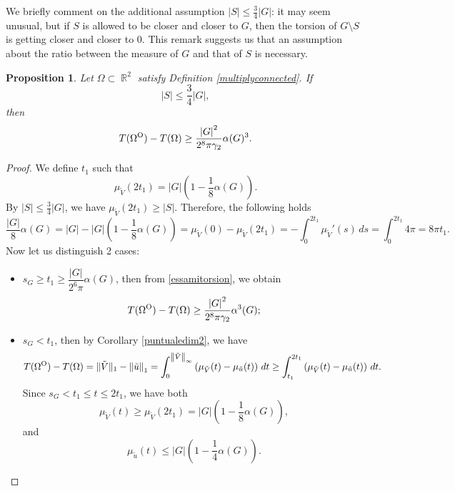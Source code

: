 \documentclass[oneside,a4paper,11pt,notitlepage]{article}
\newcommand{\abs}[1]{{\left|#1\right|}}
\newcommand{\norma}[1]{{\left\Vert#1\right\Vert}}
\theoremstyle{definition}
\theoremstyle{plain}
\newtheorem{prop}[theorem]{Proposition}
\theoremstyle{definition}
\DeclareMathOperator{\R}{\mathbb{R}}
\newcommand{\OO}{\text{\normalfont  O}}
\begin{document}
We briefly comment on the additional assumption $\abs{S} \leq \frac{3}{4} \abs{G}$: it may seem unusual, but if $S$ is allowed to be closer and closer to $G$, then the torsion of $G\setminus S$ is getting closer and closer to 0. This remark suggests us that an assumption about the ratio between the measure of $G$ and that of $S$ is necessary.

\begin{prop}\label{lemma4.2}
   Let $\Omega\subset\R^2$ satisfy Definition \ref{multiplyconnected}. If $$\abs{S} \leq \frac{3}{4}\abs{G},$$ then
    \[
    T(\Omega^\OO)- T(\Omega)\geq \frac{\abs{G}^2 }{2^8 \pi \gamma_2} {\alpha(G)^3}.\]
\end{prop}

\begin{proof}
     We define $t_1$ such that 
    $$
   \mu_{\tilde V}(2t_1) = \abs{G}\left(1- \frac{1}{8} \alpha(G)\right).
    $$
    By $\abs{S} \leq \frac{3}{4}\abs{G}$, we have $\mu_{\tilde V}(2t_1) \geq \abs{S}$. Therefore, the following holds
    \begin{equation*}
        \frac{\abs{G}}{8} \alpha(G) =\abs{G}-\abs{G}\left(1- \frac{1}{8} \alpha(G)\right)= \mu_{\tilde V}(0)- \mu_{\tilde V}(2t_1)=- \int_{0}^{2t_1} \mu_{\tilde V}'(s)\,ds= \int_{0}^{2t_1} {4\pi}= 8\pi t_1.
    \end{equation*}
    Now let us distinguish 2 cases:
    \begin{itemize}
        \item  $s_G \geq t_1 \geq \dfrac{\abs{G}}{2^6\pi} \alpha(G)$, then from \eqref{essamitorsion}, we obtain
        \begin{equation}\label{caso1}
         T(\Omega^\OO)- T(\Omega)\geq  \dfrac{\abs{G}^2}{2^8\pi\gamma_2} \alpha^3(G);
        \end{equation}
        \item $s_G <t_1$, then by Corollary \ref{puntualedim2}, we have
        \begin{equation}
        \label{93}
        T(\Omega^\OO)-T(\Omega) = 
              {\lVert\tilde V\rVert_1}-{\norma{\tilde u}_1}  = \int_0^{\norma{\tilde V}_\infty} \left(\mu_{\tilde V}(t)-\mu_{\tilde u}(t)\right)\, dt \geq \int_{t_1}^{2t_1} \left(\mu_{\tilde V}(t)-\mu_{\tilde u}(t)\right)\, dt.
        \end{equation}
        Since $s_{G} < t_1 \leq t \leq 2t_1$, we have both
        \begin{equation}
        \label{nufinale}
        \mu_{\tilde V}(t) \geq \mu_{\tilde V}(2t_1)= \abs{G}\left(1- \frac{1}{8} \alpha(G)\right),
        \end{equation}
        and
        \begin{equation}\label{mufinale}
            \mu_{\tilde u}(t) \leq \abs{G}\left(1- \frac{1}{4} \alpha(G)\right).
        \end{equation}
      

\end{itemize}
\end{proof}
\end{document}
